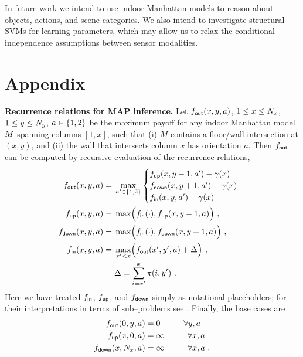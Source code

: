 In future work we intend to use indoor Manhattan models to reason
about objects, actions, and scene categories. We also intend to
investigate structural SVMs for learning parameters, which may allow
us to relax the conditional independence assumptions between sensor
modalities.

\section{Appendix}\label{sect:appendix}
\textbf{Recurrence relations for MAP inference.} Let
$f_{\textsf{out}}(x,y,a)$, $1 \leq x \leq N_x$, $1 \leq y \leq N_y$,
$a \in \{1,2\}$ be the maximum payoff for any indoor Manhattan
model $M$ spanning columns $\left[1, x\right]$, such that (i) $M$
contains a floor/wall intersection at $(x,y)$, and (ii) the wall that
intersects column $x$ has orientation $a$. Then $f_{\textsf{out}}$ can be
computed by recursive evaluation of the recurrence relations,
\begin{align}
  \label{eq:fout-recurrence}
    f_{\textsf{out}}(x,y,a) = {} & \max_{a'\in\{1,2\}}
      \begin{cases}
        f_{\textsf{up}}(x,y-1,a') - \gamma(x) & \\
        f_{\textsf{down}}(x,y+1,a') - \gamma(x) & \\
        f_{\textsf{in}}(x,y,a') - \gamma(x) &
      \end{cases}\\
  \label{eq:fup-recurrence}
  f_{\textsf{up}}(x,y,a) = {} & \max \Bigl(f_{\textsf{in}}(\cdot), f_{\textsf{up}}(x,y-1,a)\Bigr)~,\\
  \label{eq:fdown-recurrence}
  f_{\textsf{down}}(x,y,a) = {} & \max \Bigl(f_{\textsf{in}}(\cdot), f_{\textsf{down}}(x,y+1,a)\Bigr)~,\\
  \label{eq:fin-recurrence-basic}
  f_{\textsf{in}}(x,y,a) = {} &
  \max_{x'<x}\Bigl(f_{\textsf{out}}(x',y',a)+ \Delta\Bigr) ~,\\
  & \Delta = \sum_{i=x'}^{x} \pi(i,y') ~.
\end{align}
Here we have treated $f_{\textsf{in}}$, $f_{\textsf{up}}$, and $f_{\textsf{down}}$ simply as notational
placeholders; for their interpretations in terms of sub--problems see
\cite{FlintECCV10}. Finally, the base cases are
\begin{align}
  f_{\textsf{out}}(0,y,a) = {} & 0 \hspace{1cm} \forall y,a \\
  f_{\textsf{up}}(x,0,a) = {} & \infty \hspace{1cm} \forall x,a \\
  f_{\textsf{down}}(x,N_x,a) = {} & \infty \hspace{1cm} \forall x,a ~.
\end{align}


